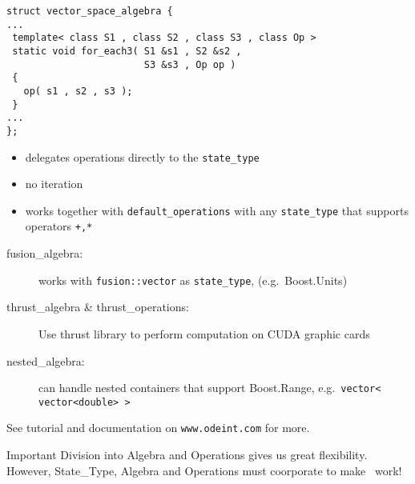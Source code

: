 \begin{frame}[fragile]

\begin{lstlisting}
struct vector_space_algebra {
...
 template< class S1 , class S2 , class S3 , class Op >
 static void for_each3( S1 &s1 , S2 &s2 , 
                        S3 &s3 , Op op )
 {
   op( s1 , s2 , s3 );
 }
...
};
\end{lstlisting}

\begin{itemize}
 \item delegates operations directly to the \lstinline+state_type+
 \item no iteration
 \item works together with \lstinline+default_operations+ with any \lstinline+state_type+ that supports operators \lstinline!+,*!
\end{itemize}

\end{frame}


\begin{frame}[fragile]

\begin{description}
 \item[fusion\_algebra:] works with \lstinline+fusion::vector+ as \lstinline+state_type+, (e.g.\ Boost.Units)
 \item[thrust\_algebra \& thrust\_operations:] Use thrust library to perform computation on CUDA graphic cards
 \item[nested\_algebra:] can handle nested containers that support Boost.Range, e.g.\ \lstinline+vector< vector<double> >+
\end{description}

See tutorial and documentation on \verb+www.odeint.com+ for more.

\pause
\vspace{0.5em}
\begin{block}{Important}
 Division into Algebra and Operations gives us great flexibility. However, State\_Type, Algebra and Operations must coorporate to make \odeint\ work!
\end{block}

\end{frame}
